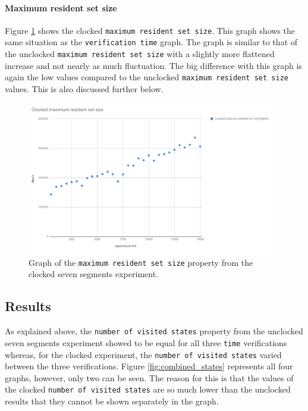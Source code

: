\paragraph{Maximum resident set size}
Figure \ref{fig:clocked_resident_size} shows the clocked \texttt{maximum resident set size}. This graph shows the same situation as the \texttt{verification time} graph. The graph is similar to that of the unclocked \texttt{maximum resident set size} with a slightly more flattened increase and not nearly as much fluctuation. The big difference with this graph is again the low values compared to the unclocked \texttt{maximum resident set size} values. This is also discussed further below.
\begin{figure}
    \includegraphics[width=0.98\textwidth]{./figures/temporary_graphs/clocked_maximum_resident_set_size.jpg}
\caption{Graph of the \texttt{maximum resident set size} property from the clocked seven segments experiment.}
\label{fig:clocked_resident_size}
\end{figure}
\subsection{Results}
As explained above, the \texttt{number of visited states} property from the unclocked seven segments experiment showed to be equal for all three \texttt{time} verifications whereas, for the clocked experiment, the \texttt{number of visited states} varied between the three verifications. Figure \ref{fig:combined_states} represents all four graphs, however, only two can be seen. %
The reason for this is that the values of the clocked \texttt{number of visited states} are so much lower than the unclocked results that they cannot be shown separately in the graph. \\

